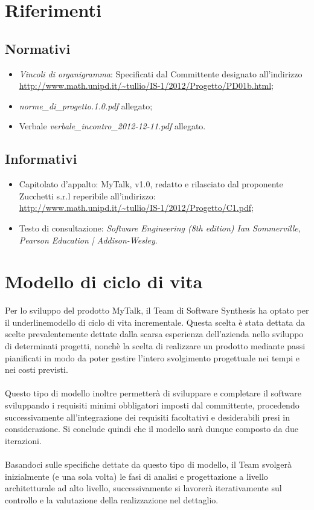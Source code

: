 \section{Riferimenti}
\subsection{Normativi}
\begin{itemize}
\item[] \textit{Vincoli di organigramma}: Specificati dal Committente designato all'indirizzo\\ \url{http://www.math.unipd.it/~tullio/IS-1/2012/Progetto/PD01b.html};
\item[] \textit{norme\_di\_progetto.1.0.pdf} allegato;
\item[] Verbale \textit{verbale\_incontro\_2012-12-11.pdf} allegato.
\end{itemize}

\subsection{Informativi}
\begin{itemize}
\item[] Capitolato d'appalto: MyTalk, v1.0, redatto e rilasciato dal proponente Zucchetti s.r.l reperibile all'indirizzo: \\ \url{http://www.math.unipd.it/~tullio/IS-1/2012/Progetto/C1.pdf};
\item[] Testo di consultazione: \textit{Software Engineering (8th edition) Ian Sommerville, Pearson Education | Addison-Wesley}.
\end{itemize}
\clearpage
\section{Modello di ciclo di vita}
Per lo sviluppo del prodotto MyTalk, il Team di Software Synthesis ha optato per il underline{modello di ciclo di vita} incrementale. Questa scelta è stata dettata da scelte prevalentemente dettate dalla scarsa esperienza dell'azienda nello sviluppo di determinati progetti, nonchè la scelta di realizzare un prodotto mediante passi pianificati in modo da poter gestire l'intero svolgimento progettuale nei tempi e nei costi previsti.\\\\
Questo tipo di modello inoltre permetterà di sviluppare e completare il software sviluppando i requisiti minimi obbligatori imposti dal committente, procedendo successivamente all'integrazione dei requisiti facoltativi e desiderabili presi in considerazione. Si conclude quindi che il modello sarà dunque composto da due iterazioni.\\\\
Basandoci sulle specifiche dettate da questo tipo di modello, il Team svolgerà inizialmente (e una sola volta) le fasi di analisi e progettazione a livello architetturale ad alto livello, successivamente si lavorerà iterativamente sul controllo e la valutazione della realizzazione nel dettaglio.\\

